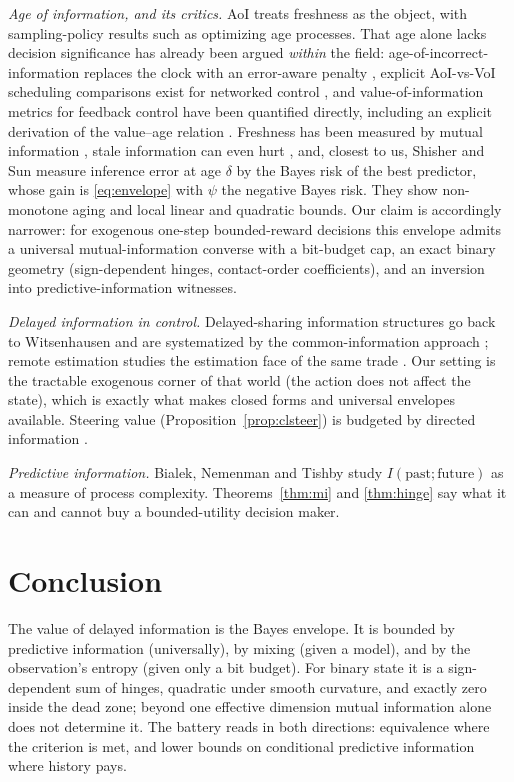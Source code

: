 \documentclass[acmsmall,screen,review,anonymous]{acmart}
\begin{document}
\emph{Age of information, and its critics.} AoI \cite{yates21} treats
freshness as the object, with sampling-policy results such as \cite{sun17}
optimizing age processes. That age alone lacks decision significance has
already been argued \emph{within} the field: age-of-incorrect-information
replaces the clock with an error-aware penalty \cite{maatouk20}, explicit
AoI-vs-VoI scheduling comparisons exist for networked control
\cite{ayan19}, and value-of-information metrics for feedback control have
been quantified directly, including an explicit derivation of the
value--age relation \cite{soleymani22,valueage24}. Freshness has been
measured by mutual information \cite{suncyr19,wangbadiucoon22}, stale
information can even hurt \cite{mitzenmacher00}, and, closest to us,
Shisher and Sun \cite{shishersun22} measure inference error at age
$\delta$ by the Bayes risk of the best predictor, whose gain is
\eqref{eq:envelope} with $\psi$ the negative Bayes risk. They show
non-monotone aging and local linear and quadratic bounds. Our claim is
accordingly narrower: for exogenous one-step bounded-reward decisions this
envelope admits a universal mutual-information converse with a bit-budget
cap, an exact binary geometry (sign-dependent hinges, contact-order
coefficients), and an inversion into predictive-information witnesses.

\emph{Delayed information in control.} Delayed-sharing information
structures go back to Witsenhausen \cite{witsenhausen71} and are
systematized by the common-information approach \cite{nayyar13}; remote
estimation studies the estimation face of the same trade
\cite{sunpolyanskiy20}. Our setting is the tractable exogenous corner of that world
(the action does not affect the state), which is exactly what makes
closed forms and universal envelopes available. Steering value
(Proposition~\ref{prop:clsteer}) is budgeted by directed information
\cite{kostinahassibi19,sabag23}.

\emph{Predictive information.} Bialek, Nemenman and Tishby
\cite{bialek01} study $I(\text{past};\text{future})$ as a measure of
process complexity. Theorems~\ref{thm:mi} and \ref{thm:hinge} say what it
can and cannot buy a bounded-utility decision maker.

\section{Conclusion}\label{sec:conclusion}

The value of delayed information is the Bayes envelope. It is bounded by
predictive information (universally), by mixing (given a model), and by
the observation's entropy (given only a bit budget). For binary state it
is a sign-dependent sum of hinges, quadratic under smooth curvature, and
exactly zero inside the dead zone; beyond one effective dimension mutual
information alone does not determine it. The battery reads in both
directions: equivalence where the criterion is met, and lower bounds on
conditional predictive information where history pays.
\end{document}
